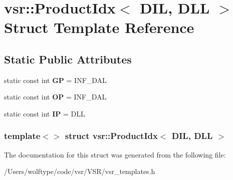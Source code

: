 \hypertarget{structvsr_1_1_product_idx_3_01_d_i_l_00_01_d_l_l_01_4}{\section{vsr\-:\-:Product\-Idx$<$ D\-I\-L, D\-L\-L $>$ Struct Template Reference}
\label{structvsr_1_1_product_idx_3_01_d_i_l_00_01_d_l_l_01_4}
}
\subsection*{Static Public Attributes}
\begin{DoxyCompactItemize}
\item 
\hypertarget{structvsr_1_1_product_idx_3_01_d_i_l_00_01_d_l_l_01_4_aca8d5689e7e3834e3645f7932faac40b}{static const int {\bfseries G\-P} = I\-N\-F\-\_\-\-D\-A\-L}\label{structvsr_1_1_product_idx_3_01_d_i_l_00_01_d_l_l_01_4_aca8d5689e7e3834e3645f7932faac40b}

\item 
\hypertarget{structvsr_1_1_product_idx_3_01_d_i_l_00_01_d_l_l_01_4_a6f37cffe2567f01eb4bb75929acdb6f5}{static const int {\bfseries O\-P} = I\-N\-F\-\_\-\-D\-A\-L}\label{structvsr_1_1_product_idx_3_01_d_i_l_00_01_d_l_l_01_4_a6f37cffe2567f01eb4bb75929acdb6f5}

\item 
\hypertarget{structvsr_1_1_product_idx_3_01_d_i_l_00_01_d_l_l_01_4_adfff0cb697b13cd36894801650d3f516}{static const int {\bfseries I\-P} = D\-L\-L}\label{structvsr_1_1_product_idx_3_01_d_i_l_00_01_d_l_l_01_4_adfff0cb697b13cd36894801650d3f516}

\end{DoxyCompactItemize}
\subsubsection*{template$<$$>$ struct vsr\-::\-Product\-Idx$<$ D\-I\-L, D\-L\-L $>$}



The documentation for this struct was generated from the following file\-:\begin{DoxyCompactItemize}
\item 
/\-Users/wolftype/code/vsr/\-V\-S\-R/vsr\-\_\-templates.\-h\end{DoxyCompactItemize}

